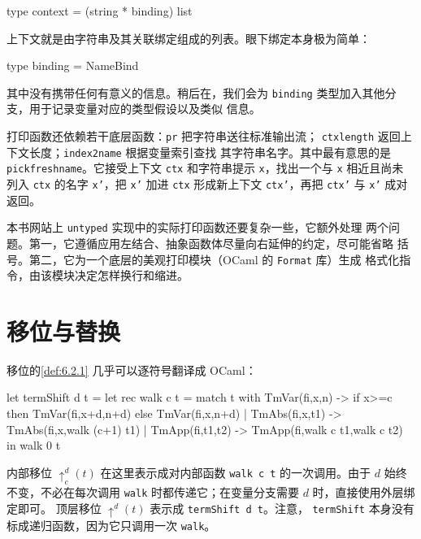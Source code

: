 \begin{taplocamlcode}
type context = (string * binding) list
\end{taplocamlcode}

上下文就是由字符串及其关联绑定组成的列表。眼下绑定本身极为简单：

\begin{taplocamlcode}
type binding = NameBind
\end{taplocamlcode}

其中没有携带任何有意义的信息。稍后在，我们会为
\texttt{binding} 类型加入其他分支，用于记录变量对应的类型假设以及类似
信息。

打印函数还依赖若干底层函数：\texttt{pr} 把字符串送往标准输出流；
\texttt{ctxlength} 返回上下文长度；\texttt{index2name} 根据变量索引查找
其字符串名字。其中最有意思的是 \texttt{pickfreshname}。它接受上下文
\texttt{ctx} 和字符串提示 \texttt{x}，找出一个与 \texttt{x} 相近且尚未
列入 \texttt{ctx} 的名字 \texttt{x'}，把 \texttt{x'} 加进
\texttt{ctx} 形成新上下文 \texttt{ctx'}，再把 \texttt{ctx'} 与
\texttt{x'} 成对返回。


本书网站上 \texttt{untyped} 实现中的实际打印函数还要复杂一些，它额外处理
两个问题。第一，它遵循应用左结合、抽象函数体尽量向右延伸的约定，尽可能省略
括号。第二，它为一个底层的美观打印模块（OCaml 的 \texttt{Format} 库）生成
格式化指令，由该模块决定怎样换行和缩进。

\section{移位与替换}
\label{sec:7.2}

移位的\cref{def:6.2.1} 几乎可以逐符号翻译成 OCaml：

\begin{taplocamlcode}
let termShift d t =
  let rec walk c t = match t with
      TmVar(fi,x,n) ->
        if x>=c then TmVar(fi,x+d,n+d)
        else TmVar(fi,x,n+d)
    | TmAbs(fi,x,t1) ->
        TmAbs(fi,x,walk (c+1) t1)
    | TmApp(fi,t1,t2) ->
        TmApp(fi,walk c t1,walk c t2)
  in walk 0 t
\end{taplocamlcode}

内部移位 \(\uparrow^d_c(t)\) 在这里表示成对内部函数
\texttt{walk c t} 的一次调用。由于 \(d\) 始终不变，不必在每次调用
\texttt{walk} 时都传递它；在变量分支需要 \(d\) 时，直接使用外层绑定即可。
顶层移位 \(\uparrow^d(t)\) 表示成 \texttt{termShift d t}。注意，
\texttt{termShift} 本身没有标成递归函数，因为它只调用一次
\texttt{walk}。

